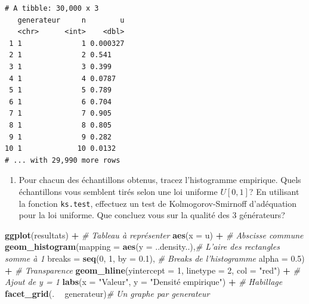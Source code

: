 \documentclass[]{article}
\newenvironment{Shaded}{\begin{snugshade}}{\end{snugshade}}
\newcommand{\CommentTok}[1]{\textcolor[rgb]{0.56,0.35,0.01}{\textit{#1}}}
\newcommand{\DataTypeTok}[1]{\textcolor[rgb]{0.13,0.29,0.53}{#1}}
\newcommand{\DecValTok}[1]{\textcolor[rgb]{0.00,0.00,0.81}{#1}}
\newcommand{\FloatTok}[1]{\textcolor[rgb]{0.00,0.00,0.81}{#1}}
\newcommand{\KeywordTok}[1]{\textcolor[rgb]{0.13,0.29,0.53}{\textbf{#1}}}
\newcommand{\NormalTok}[1]{#1}
\newcommand{\OperatorTok}[1]{\textcolor[rgb]{0.81,0.36,0.00}{\textbf{#1}}}
\newcommand{\StringTok}[1]{\textcolor[rgb]{0.31,0.60,0.02}{#1}}
\providecommand{\tightlist}{%
  \setlength{\itemsep}{0pt}\setlength{\parskip}{0pt}}
\begin{document}
\begin{verbatim}
# A tibble: 30,000 x 3
   generateur     n        u
   <chr>      <int>    <dbl>
 1 1              1 0.000327
 2 1              2 0.541   
 3 1              3 0.399   
 4 1              4 0.0787  
 5 1              5 0.789   
 6 1              6 0.704   
 7 1              7 0.905   
 8 1              8 0.805   
 9 1              9 0.282   
10 1             10 0.0132  
# ... with 29,990 more rows
\end{verbatim}

\begin{enumerate}
\def\labelenumi{\arabic{enumi}.}
\setcounter{enumi}{2}
\tightlist
\item
  Pour chacun des échantillons obtenus, tracez l'histogramme empirique.
  Quels échantillons vous semblent tirés selon une loi uniforme
  \(U[0, 1]\)? En utilisant la fonction \texttt{ks.test}, effectuez un
  test de Kolmogorov-Smirnoff d'adéquation pour la loi uniforme. Que
  concluez vous sur la qualité des 3 générateurs?
\end{enumerate}

\begin{Shaded}
\begin{Highlighting}[]
\KeywordTok{ggplot}\NormalTok{(resultats) }\OperatorTok{+}\StringTok{ }\CommentTok{# Tableau à représenter}
\StringTok{  }\KeywordTok{aes}\NormalTok{(}\DataTypeTok{x =}\NormalTok{ u) }\OperatorTok{+}\StringTok{ }\CommentTok{# Abscisse commune}
\StringTok{  }\KeywordTok{geom_histogram}\NormalTok{(}\DataTypeTok{mapping =} \KeywordTok{aes}\NormalTok{(}\DataTypeTok{y =}\NormalTok{ ..density..),}\CommentTok{# L'aire des rectangles somme à 1}
                 \DataTypeTok{breaks =} \KeywordTok{seq}\NormalTok{(}\DecValTok{0}\NormalTok{, }\DecValTok{1}\NormalTok{, }\DataTypeTok{by =} \FloatTok{0.1}\NormalTok{), }\CommentTok{# Breaks de l'histogramme  }
                 \DataTypeTok{alpha =} \FloatTok{0.5}\NormalTok{) }\OperatorTok{+}\StringTok{ }\CommentTok{# Transparence}
\StringTok{  }\KeywordTok{geom_hline}\NormalTok{(}\DataTypeTok{yintercept =} \DecValTok{1}\NormalTok{, }\DataTypeTok{linetype =} \DecValTok{2}\NormalTok{, }\DataTypeTok{col =} \StringTok{"red"}\NormalTok{) }\OperatorTok{+}\StringTok{ }\CommentTok{# Ajout de y = 1}
\StringTok{  }\KeywordTok{labs}\NormalTok{(}\DataTypeTok{x =} \StringTok{"Valeur"}\NormalTok{, }\DataTypeTok{y =} \StringTok{"Densité empirique"}\NormalTok{) }\OperatorTok{+}\StringTok{ }\CommentTok{# Habillage}
\StringTok{  }\KeywordTok{facet_grid}\NormalTok{(. }\OperatorTok{~}\StringTok{ }\NormalTok{generateur)}\CommentTok{# Un graphe par generateur}
\end{Highlighting}
\end{Shaded}
\end{document}
